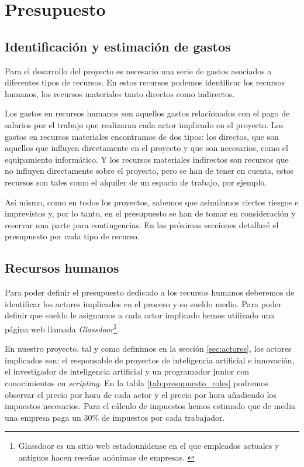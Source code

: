 \chapter{Presupuesto}
\label{cap:presupuesto}

\section{Identificación y estimación de gastos}
\label{sec:identificacion_gastos}


Para el desarrollo del proyecto es necesario una serie de gastos asociados a diferentes tipos de recursos. En estos recursos podemos identificar los
recursos humanos, los recursos materiales tanto directos como indirectos.

Los gastos en recursos humanos son aquellos gastos relacionados con el pago de salarios por el trabajo que realizaran cada actor implicado en el proyecto.
Los gastos en recursos materiales encontramos de dos tipos: los directos, que son aquellos que influyen directamente en el proyecto y que son necesarios, como
el equipamiento informático. Y los recursos materiales indirectos son recursos que no influyen directamente sobre el proyecto, pero se han de tener en cuenta,
estos recursos son tales como el alquiler de un espacio de trabajo, por ejemplo.

Así mismo, como en todos los proyectos, sabemos que asimilamos ciertos riesgos e imprevistos y, por lo tanto, en el presupuesto se han de tomar en consideración y
reservar una parte para contingencias. En las próximas secciones detallaré el presupuesto por cada tipo de recurso.

\section{Recursos humanos}
\label{sec:recursos_humanos}


Para poder definir el presupuesto dedicado a los recursos humanos deberemos de identificar los actores implicados en el proceso y su sueldo medio. Para poder definir que sueldo
le asignamos a cada actor implicado hemos utilizado una página web llamada \textit{Glassdoor}\footnote{Glassdoor es un sitio web estadounidense en el que empleados actuales y
antiguos hacen reseñas anónimas de empresas. \cite{Glassdoor}}.

En nuestro proyecto, tal y como definimos en la sección \ref{sec:actores}, los actores implicados son: el responsable de proyectos de inteligencia artificial e innovación,
el investigador de inteligencia artificial y un programador junior con conocimientos en \textit{scripting}. En la tabla \ref{tab:presupuesto_roles} podremos observar el precio
por hora de cada actor y el precio por hora añadiendo los impuestos necesarios. Para el cálculo de impuestos hemos estimado que de media una empresa paga un 30\% de impuestos por
cada trabajador.


